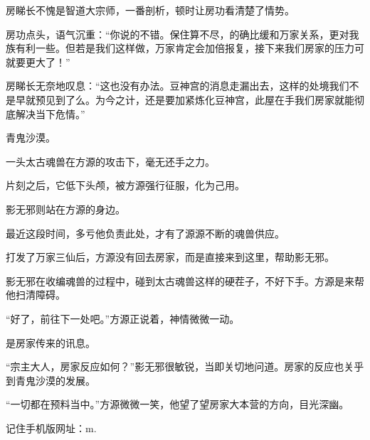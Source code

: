 \begin{this_body}
房睇长不愧是智道大宗师，一番剖析，顿时让房功看清楚了情势。

房功点头，语气沉重：“你说的不错。保住算不尽，的确比缓和万家关系，更对我族有利一些。但若是我们这样做，万家肯定会加倍报复，接下来我们房家的压力可就要更大了！”

房睇长无奈地叹息：“这也没有办法。豆神宫的消息走漏出去，这样的处境我们不是早就预见到了么。为今之计，还是要加紧炼化豆神宫，此屋在手我们房家就能彻底解决当下危情。”

青鬼沙漠。

一头太古魂兽在方源的攻击下，毫无还手之力。

片刻之后，它低下头颅，被方源强行征服，化为己用。

影无邪则站在方源的身边。

最近这段时间，多亏他负责此处，才有了源源不断的魂兽供应。

打发了万家三仙后，方源没有回去房家，而是直接来到这里，帮助影无邪。

影无邪在收编魂兽的过程中，碰到太古魂兽这样的硬茬子，不好下手。方源是来帮他扫清障碍。

“好了，前往下一处吧。”方源正说着，神情微微一动。

是房家传来的讯息。

“宗主大人，房家反应如何？”影无邪很敏锐，当即关切地问道。房家的反应也关乎到青鬼沙漠的发展。

“一切都在预料当中。”方源微微一笑，他望了望房家大本营的方向，目光深幽。

记住手机版网址：m.

\end{this_body}

